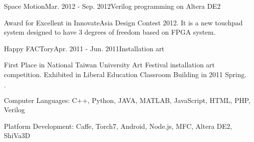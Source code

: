 \documentclass{joel_cv}
\begin{document}
\begin{sectionContentNormal}{Space Motion}{Mar. 2012 - Sep. 2012}{Verilog programming on Altera DE2}
	\item Award for Excellent in InnovateAsia Design Contest 2012. It is a new touchpad system designed to have 3 degrees of freedom based on FPGA system.
\end{sectionContentNormal}

\begin{sectionContentNormal}{Happy FACTory}{Apr. 2011 - Jun. 2011}{Installation art}
	\item First Place in National Taiwan University Art Festival installation art competition. Exhibited in Liberal Education Classroom Building in 2011 Spring.
\end{sectionContentNormal}

%
%

\begin{sectionItemize}{$\cdot$}
	\item Computer Languages: C++, Python, JAVA, MATLAB, JavaScript, HTML, PHP, Verilog
	\item Platform Development: Caffe, Torch7, Android, Node.js, MFC, Altera DE2, ShiVa3D
\end{sectionItemize}
\end{document}
